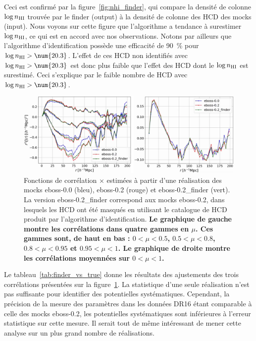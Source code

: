 Ceci est confirmé par la figure~\ref{fig:nhi_finder}, qui compare la densité de colonne $\log n_{\textsc{HI}}$ trouvée par le finder (output) à la densité de colonne des HCD des mocks (input). Nous voyons sur cette figure que l'algorithme a tendance à surestimer $\log n_{\textsc{HI}}$, ce qui est en accord avec nos observations.
Notons par ailleurs que l'algorithme d'identification possède une efficacité de \SI{90}{\percent} pour $\log n_{\textsc{HI}} > \num{20.3}$. L'effet de ces HCD non identifiés avec $\log n_{\textsc{HI}} > \num{20.3}$ est donc plus faible que l'effet des HCD dont le $\log n_{\textsc{HI}}$ est surestimé.
  Ceci s'explique par le faible nombre de HCD avec $\log n_{\textsc{HI}} > \num{20.3}$.


\begin{figure}
  \centering
  \includegraphics[scale=0.4]{cf_finder_vs_true}
  \caption{Fonctions de corrélation \lya{}$\times$\lya{} estimées à partir d'une réalisation des mocks eboss-0.0 (bleu), eboss-0.2 (rouge) et eboss-0.2\_finder (vert). La version eboss-0.2\_finder correspond aux mocks eboss-0.2, dans lesquels les HCD ont été masqués en utilisant le catalogue de HCD produit par l'algorithme d'identification.
    \textbf{Le graphique de gauche montre les corrélations dans quatre gammes en $\mu$. Ces gammes sont, de haut en bas : $\num{0} < \mu < \num{0.5}$, $\num{0.5} < \mu < \num{0.8}$, $\num{0.8} < \mu < \num{0.95}$ et $\num{0.95} < \mu < \num{1}$. Le graphique de droite montre les corrélations moyennées sur $\num{0}  < \mu < \num{1}$.}}
  \label{fig:cf_finder_vs_true}
\end{figure}

Le tableau~\ref{tab:finder_vs_true} donne les résultats des ajustements des trois corrélations présentées sur la figure~\ref{fig:cf_finder_vs_true}. La statistique d'une seule réalisation n'est pas suffisante pour identifier des potentielles systématiques. Cependant, la précision de la mesure des paramètres \lya{} dans les données DR16 étant comparable à celle des mocks eboss-0.2, les potentielles systématiques sont inférieures à l'erreur statistique sur cette mesure.
Il serait tout de même intéressant de mener cette analyse sur un plus grand nombre de réalisations.


